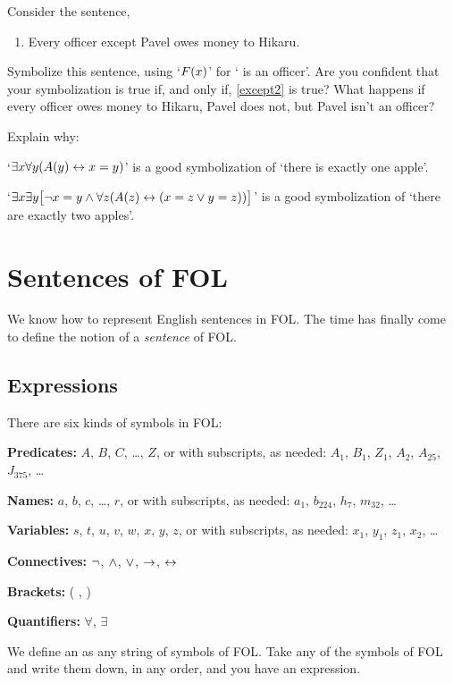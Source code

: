 \problempart 
Consider the sentence,
\begin{enumerate}
	\item\label{except2} Every officer except Pavel owes money to Hikaru.
\end{enumerate}
Symbolize this sentence, using `$F(x)$' for ` is an officer'.  Are you confident that your symbolization is true if, and only if, \cref*{except2} is true?  What happens if every officer owes money to Hikaru, Pavel does not, but Pavel isn't an officer?

\problempart 
Explain why:
	\begin{compactlist}
		\item `$\exists x \forall y(A(y) \leftrightarrow x= y)$' is a good
		symbolization of `there is exactly one apple'.
		\item `$\exists x \exists y \bigl[\neg x = y \wedge \forall
		z(A(z) \leftrightarrow (x= z \vee y = z))\bigr]$' is a good
		symbolization of `there are exactly two apples'.
	\end{compactlist}


\chapter{Sentences of FOL}\label{s:FOLSentences}
We know how to represent English sentences in FOL. The time has finally come to define the notion of a \emph{sentence} of FOL.

\section{Expressions}
There are six kinds of symbols in FOL:

\begin{compactlist}
\item \textbf{Predicates:} $A$, $B$, $C$, \dots, $Z$, or 
with subscripts, as needed: $A_1$, $B_1$, $Z_1$, $A_2$, $A_{25}$,
$J_{375}$, \dots
\item \textbf{Names:} $a$, $b$, $c$, \dots, $r$, or
with subscripts, as needed: $a_1$, $b_{224}$, $h_7$, $m_{32}$, \dots
\item \textbf{Variables:} $s$, $t$, $u$, $v$, $w$, $x$, $y$, $z$, or
with subscripts, as needed: $x_1$, $y_1$, $z_1$, $x_2$, \dots
\item \textbf{Connectives:}  $\neg$, $\wedge$, $\vee$, $\rightarrow$, $\leftrightarrow$
\item \textbf{Brackets:} ( , )
\item \textbf{Quantifiers:}  $\forall$, $\exists$
\end{compactlist}
We define an  as any string of symbols of FOL. Take any of the symbols of FOL and write them down, in any order, and you have an expression.

